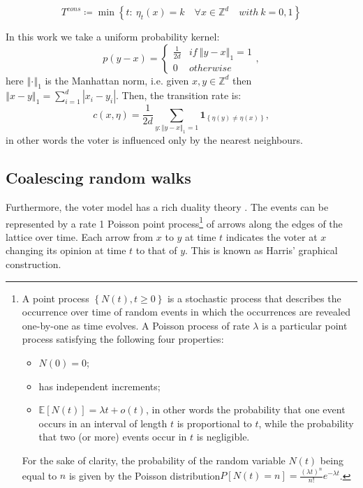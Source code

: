 \[
T^{cons}\coloneqq\min\left\{ t:\ \eta_{t}\left(x\right)=k\quad\forall x\in\mathbb{Z}^{d}\quad with\ k=0,1\right\} 
\]

In this work we take a uniform probability kernel:
\[
p(y-x)=\begin{cases}
\frac{1}{2d} & if\ \left\Vert y-x\right\Vert _{1}=1\\
0 & otherwise
\end{cases},
\]
here $\left\Vert \cdotp\right\Vert _{1}$ is the Manhattan norm, i.e.
given $x,y\in\mathbb{Z}^{d}$ then $\left\Vert x-y\right\Vert _{1}=\sum_{i=1}^{d}\left|x_{i}-y_{i}\right|$.
Then, the transition rate is:
\[
c\left(x,\eta\right)=\frac{1}{2d}\sum_{y:\left\Vert y-x\right\Vert _{1}=1}\mathbf{1}_{\left\{ \eta\left(y\right)\neq\eta\left(x\right)\right\} },
\]
in other words the voter is influenced only by the nearest neighbours. 

\subsection{Coalescing random walks}

Furthermore, the voter model has a rich duality theory \cite{schertzer_brownian_2017,durrett_spatial_2014}.
The events can be represented by a rate 1 Poisson point process\footnote{A point process $\left\{ N\left(t\right),t\geq0\right\} $ is a stochastic
process \cite{daley2003an,wiki} that describes the occurrence over
time of random events in which the occurrences are revealed one-by-one
as time evolves. A Poisson process of rate $\lambda$ is a particular
point process satisfying the following four properties: 
\begin{itemize}
\item ${\textstyle N\left(0\right)=0}$;
\item has independent increments;
\item ${\displaystyle \mathbb{E}[N(t)]=\lambda t}+o\left(t\right)$, in
other words the probability that one event occurs in an interval of
length $t$ is proportional to $t$, while the probability that two
(or more) events occur in $t$ is negligible.
\end{itemize}
For the sake of clarity, the probability of the random variable $N\left(t\right)$
being equal to $n$ is given by the Poisson distribution$P\left[N(t)=n\right]=\frac{(\lambda t)^{n}}{n!}e^{-\lambda t}$.} of arrows along the edges of the lattice over time. Each arrow from
$x$ to $y$ at time $t$ indicates the voter at $x$ changing its
opinion at time $t$ to that of $y$. This is known as Harris\textquoteright{}
graphical construction. 

